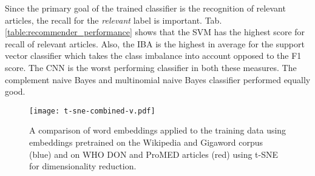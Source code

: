   Since the primary goal of the trained classifier is the recognition of relevant articles, the recall for the \textsl{relevant} label is important.
  Tab. \ref{table:recommender_performance} shows that the SVM has the highest score for recall of relevant articles.
  Also, the IBA is the highest in average for the support vector classifier which takes the class imbalance into account opposed to the F1 score.
  The CNN is the worst performing classifier in both these measures.
  The complement naive Bayes and multinomial naive Bayes classifier performed equally good.

  \begin{figure}
    \centering
    \texttt{[image: t-sne-combined-v.pdf]}
    \caption{A comparison of word embeddings applied to the training data using embeddings pretrained on the Wikipedia and Gigaword corpus (blue) and on WHO DON and ProMED articles (red) using t-SNE for dimensionality reduction.}
  \label{fig:t-sne}
  \end{figure}

